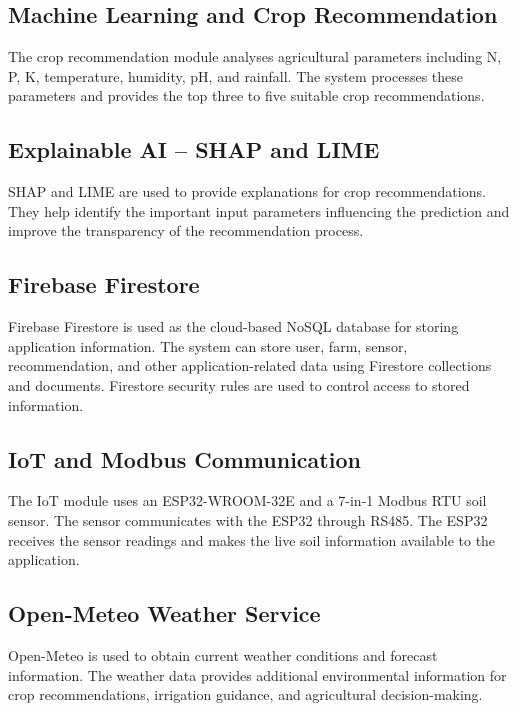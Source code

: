 \subsection{Machine Learning and Crop Recommendation}

The crop recommendation module analyses agricultural parameters including N, P, K, temperature, humidity, pH, and rainfall. The system processes these parameters and provides the top three to five suitable crop recommendations.

\subsection{Explainable AI -- SHAP and LIME}

SHAP and LIME are used to provide explanations for crop recommendations. They help identify the important input parameters influencing the prediction and improve the transparency of the recommendation process.

\subsection{Firebase Firestore}

Firebase Firestore is used as the cloud-based NoSQL database for storing application information. The system can store user, farm, sensor, recommendation, and other application-related data using Firestore collections and documents. Firestore security rules are used to control access to stored information.

\subsection{IoT and Modbus Communication}

The IoT module uses an ESP32-WROOM-32E and a 7-in-1 Modbus RTU soil sensor. The sensor communicates with the ESP32 through RS485. The ESP32 receives the sensor readings and makes the live soil information available to the application.

\subsection{Open-Meteo Weather Service}

Open-Meteo is used to obtain current weather conditions and forecast information. The weather data provides additional environmental information for crop recommendations, irrigation guidance, and agricultural decision-making.

